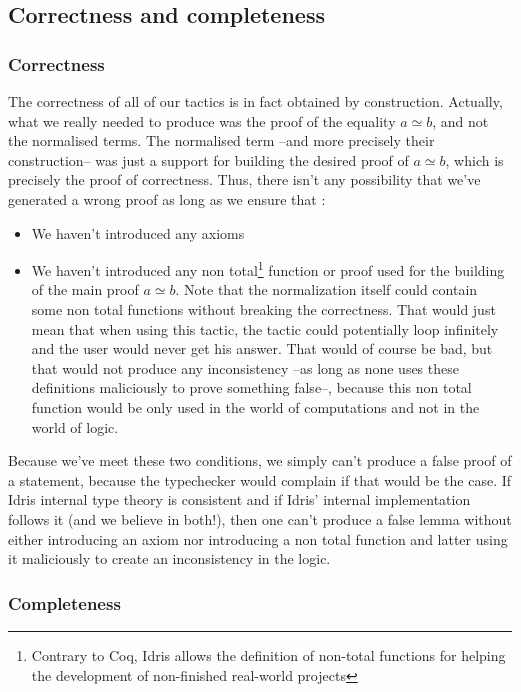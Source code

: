 	\subsection {Correctness and completeness}

		\subsubsection{Correctness}
		
The correctness of all of our tactics is in fact obtained by construction. Actually, what we really needed to produce was the proof of the equality $a \simeq b$, and not the normalised terms. The normalised term --and more precisely their construction-- was just a support for building the desired proof of $a \simeq b$, which is precisely the proof of correctness. Thus, there isn't any possibility that we've generated a wrong proof as long as we ensure that :
\begin{itemize}
\item We haven't introduced any axioms
\item We haven't introduced any non total\footnote{Contrary to Coq, Idris allows the definition of non-total functions for helping the development of non-finished real-world projects} function or proof used for the building of the main proof $a \simeq b$. Note that the normalization itself could contain some non total functions without breaking the correctness. That would just mean that when using this tactic, the tactic could potentially loop infinitely and the user would never get his answer. That would of course be bad, but that would not produce any inconsistency --as long as none uses these definitions maliciously to prove something false--, because this non total function would be only used in the world of computations and not in the world of logic.
\end{itemize}

Because we've meet these two conditions, we simply can't produce a false proof of a statement, because the typechecker would complain if that would be the case. If Idris internal type theory is consistent and if Idris' internal implementation follows it (and we believe in both!), then one can't produce a false lemma without either introducing an axiom nor introducing a non total function and latter using it maliciously to create an inconsistency in the logic.

		
		\subsubsection{Completeness}
		
